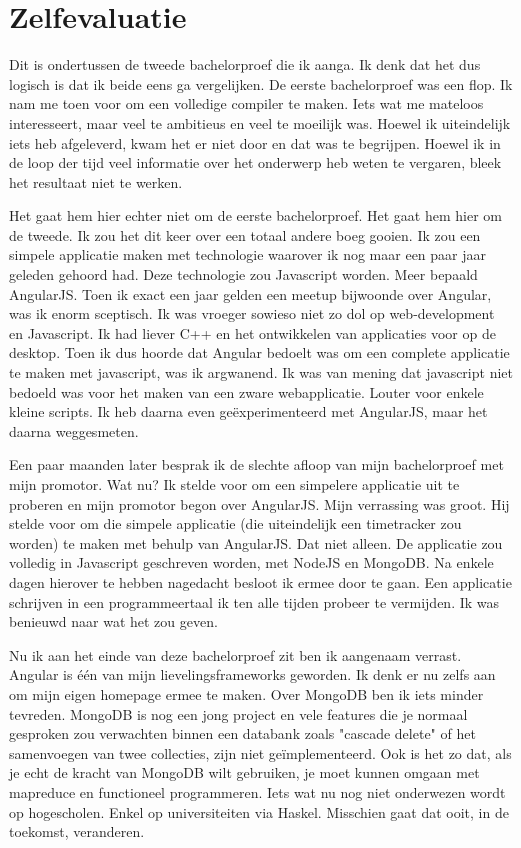 \documentclass[a4paper,11pt]{article}
\begin{document}
\section{Zelfevaluatie}
Dit is ondertussen de tweede bachelorproef die ik aanga. Ik denk dat het dus logisch is dat ik beide eens ga vergelijken. De eerste bachelorproef was een flop. Ik nam me toen voor om een volledige compiler te maken. Iets wat me mateloos interesseert, maar veel te ambitieus en veel te moeilijk was. Hoewel ik uiteindelijk iets heb afgeleverd, kwam het er niet door en dat was te begrijpen. Hoewel ik in de loop der tijd veel informatie over het onderwerp heb weten te vergaren, bleek het resultaat niet te werken.

Het gaat hem hier echter niet om de eerste bachelorproef. Het gaat hem hier om de tweede. Ik zou het dit keer over een totaal andere boeg gooien. Ik zou een simpele applicatie maken met technologie waarover ik nog maar een paar jaar geleden gehoord had. Deze technologie zou Javascript worden. Meer bepaald AngularJS. Toen ik exact een jaar gelden een meetup bijwoonde over Angular, was ik enorm sceptisch. Ik was vroeger sowieso niet zo dol op web-development en Javascript. Ik had liever C++ en het ontwikkelen van applicaties voor op de desktop. Toen ik dus hoorde dat Angular bedoelt was om een complete applicatie te maken met javascript, was ik argwanend. Ik was van mening dat javascript niet bedoeld was voor het maken van een zware webapplicatie. Louter voor enkele kleine scripts. Ik heb daarna even geëxperimenteerd met AngularJS, maar het daarna weggesmeten.

Een paar maanden later besprak ik de slechte afloop van mijn bachelorproef met mijn promotor. Wat nu? Ik stelde voor om een simpelere applicatie uit te proberen en mijn promotor begon over AngularJS. Mijn verrassing was groot. Hij stelde voor om die simpele applicatie (die uiteindelijk een timetracker zou worden) te maken met behulp van AngularJS. Dat niet alleen. De applicatie zou volledig in Javascript geschreven worden, met NodeJS en MongoDB. Na enkele dagen hierover te hebben nagedacht besloot ik ermee door te gaan. Een applicatie schrijven in een programmeertaal ik ten alle tijden probeer te vermijden. Ik was benieuwd naar wat het zou geven.

Nu ik aan het einde van deze bachelorproef zit ben ik aangenaam verrast. Angular is één van mijn lievelingsframeworks geworden. Ik denk er nu zelfs aan om mijn eigen homepage ermee te maken. Over MongoDB ben ik iets minder tevreden. MongoDB is nog een jong project en vele features die je normaal gesproken zou verwachten binnen een databank zoals "cascade delete" of het samenvoegen van twee collecties, zijn niet geïmplementeerd. Ook is het zo dat, als je echt de kracht van MongoDB wilt gebruiken, je moet kunnen omgaan met mapreduce en functioneel programmeren. Iets wat nu nog niet onderwezen wordt op hogescholen. Enkel op universiteiten via Haskel. Misschien gaat dat ooit, in de toekomst, veranderen.
\end{document}
